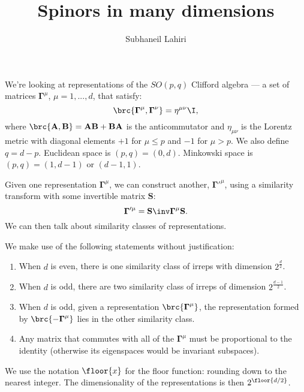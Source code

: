 \documentclass[11pt]{article}
\newcommand{\Gammab}{\boldsymbol{\Gamma}}
\renewcommand{\S}{\mathbf{S}}
\newcommand{\A}{\mathbf{A}}
\newcommand{\B}{\mathbf{B}}
\begin{document}
\title{Spinors in many dimensions}
\author{Subhaneil Lahiri}
\date{}
\maketitle

We're looking at representations of the $SO(p,q)$ Clifford algebra --- a set of matrices $\Gammab^\mu$, $\mu = 1, ..., d$, that satisfy:
%
\begin{equation}\label{eq:clifford}
  \brc{ \Gammab^\mu, \Gammab^\nu } = \eta^{\mu\nu} \I,
\end{equation}
%
where $\brc{ \A, \B } = \A\B + \B\A$ is the anticommutator and $\eta_{\mu\nu}$ is the Lorentz metric with diagonal elements $+1$ for $\mu \leq p$ and $-1$ for $\mu > p$. We also define $q = d - p$.
Euclidean space is \( (p,q) = (0,d) \).
Minkowski space is \( (p,q) = (1,d-1) \) or \( (d-1,1) \).

Given one representation $\Gammab^\mu$, we can construct another, $\Gammab'^{\mu}$, using a similarity transform with some invertible matrix $\S$:
%
\begin{equation}\label{eq:similarity}
  \Gammab'^{\mu} = \S\inv \Gammab^\mu \S.
\end{equation}
%
We can then talk about similarity classes of representations.

We make use of the following statements without justification:
%
\begin{enumerate}
  \item When $d$ is even, there is one similarity class of irreps with dimension $2^{ \frac{d}{2} }$. \label{it:even}
  \item When $d$ is odd, there are two similarity class of irreps of dimension $2^{ \frac{d-1}{2} }$. \label{it:odd}
  \item When $d$ is odd, given a representation $\brc{\Gammab^\mu}$, the representation formed by $\brc{ -\Gammab^\mu }$ lies in the other similarity class. \label{it:oddchi}
  \item Any matrix that commutes with all of the $\Gammab^\mu$ must be proportional to the identity (otherwise its eigenspaces would be invariant subspaces). \label{it:commute}
\end{enumerate}

We use the notation $\floor{x}$ for the floor function: rounding down to the nearest integer.
The dimensionality of the representations is then $2^{\floor{d/2}}$.
\end{document}
